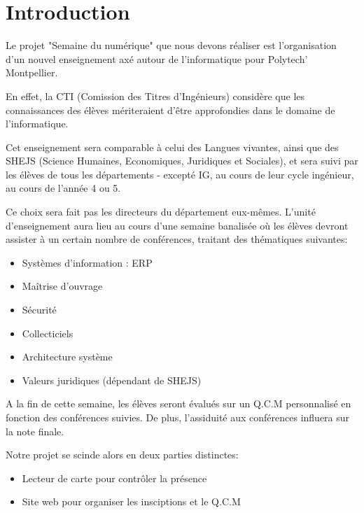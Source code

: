\chapter{Introduction}

Le projet "Semaine du numérique" que nous devons réaliser est l’organisation
d'un nouvel enseignement axé autour de l'informatique pour Polytech' Montpellier.

En effet, la CTI (Comission des Titres d'Ingénieurs) considère que les 
connaissances des élèves mériteraient d'être approfondies dans le domaine de l'informatique.

Cet enseignement sera comparable à celui des Langues vivantes, ainsi que des
SHEJS (Science Humaines, Economiques, Juridiques et Sociales), et sera suivi
par les élèves de tous les départements - excepté IG, au cours de leur cycle 
ingénieur, au cours de l'année 4 ou 5.

Ce choix sera fait pas les directeurs du département eux-mêmes. L'unité 
d'enseignement aura lieu au cours d'une semaine banalisée où les élèves 
devront assister à un certain nombre de conférences, traitant des thématiques 
suivantes:

\begin{itemize}
\item Systèmes d’information : ERP
\item Maîtrise d’ouvrage
\item Sécurité
\item Collecticiels
\item Architecture système
\item Valeurs juridiques (dépendant de SHEJS)
\end{itemize}

A la fin de cette semaine, les élèves seront évalués sur un Q.C.M personnalisé 
en fonction des conférences suivies. De plus, l'assiduité aux conférences influera
sur la note finale.

Notre projet se scinde alors en deux parties distinctes:

\begin{itemize}
\item Lecteur de carte pour contrôler la présence
\item Site web pour organiser les insciptions et le  Q.C.M
\end{itemize}
